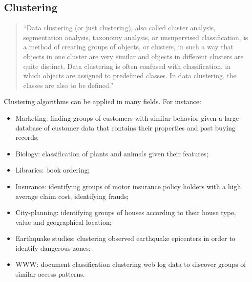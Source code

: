 \subsection{Clustering}
\label{sec:clustering}

\begin{quotation}
``Data clustering (or just clustering), also called cluster analysis, segmentation analysis, taxonomy analysis, or unsupervised classification,
is a method of creating groups of objects, or clusters, in such a way that objects in one cluster are very similar and objects in different clusters are quite distinct.
Data clustering is often confused with classification, in which objects are assigned to predefined classes. In data clustering, the classes are also to be defined.''~\cite{data_clustering_book}
\end{quotation}

Clustering algorithms can be applied in many fields. For instance:

\begin{itemize}
\item Marketing: finding groups of customers with similar behavior given a large database of customer data that contains their properties and past buying records;
\item Biology: classification of plants and animals given their features;
\item Libraries: book ordering;
\item Insurance: identifying groups of motor insurance policy holders with a high average claim cost, identifying frauds;
\item City-planning: identifying groups of houses according to their house type, value and geographical location;
\item Earthquake studies: clustering observed earthquake epicenters in order to identify dangerous zones;
\item WWW: document classification clustering web log data to discover groups of similar access patterns.
\end{itemize}